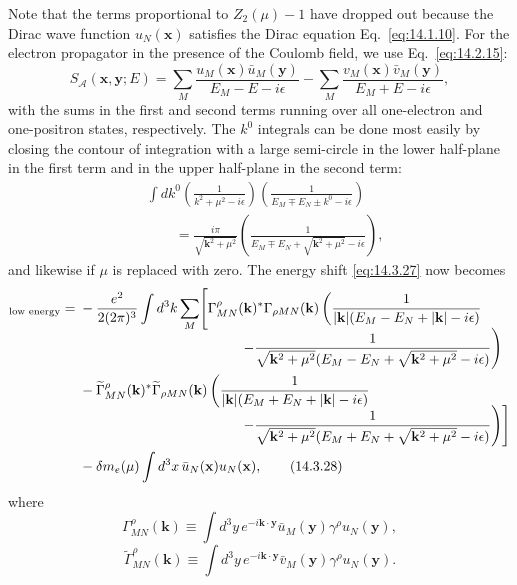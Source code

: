 Note that the terms proportional to $Z_2(\mu)-1$ have dropped out because the
Dirac wave function $u_N(\mathbf x)$ satisfies the Dirac equation
Eq.~\eqref{eq:14.1.10}. For the electron propagator in the presence of the
Coulomb field, we use Eq.~\eqref{eq:14.2.15}:
\[
S_{\mathcal A}(\mathbf x,\mathbf y;E)
=\sum_M\frac{u_M(\mathbf x)\bar u_M(\mathbf y)}{E_M-E-i\epsilon}
-\sum_M\frac{v_M(\mathbf x)\bar v_M(\mathbf y)}{E_M+E-i\epsilon},
\]
with the sums in the first and second terms running over all one-electron and
one-positron states, respectively. The $k^0$ integrals can be done most easily
by closing the contour of integration with a large semi-circle in the lower
half-plane in the first term and in the upper half-plane in the second term:
\begin{align*}
&\int dk^0\left(\frac{1}{k^2+\mu^2-i\epsilon}\right)
\left(\frac{1}{E_M\mp E_N\pm k^0-i\epsilon}\right)\\
&\qquad={}
\frac{i\pi}{\sqrt{\mathbf k^2+\mu^2}}
\left(\frac{1}{E_M\mp E_N+\sqrt{\mathbf k^2+\mu^2}-i\epsilon}\right),
\end{align*}
and likewise if $\mu$ is replaced with zero. The energy shift
\eqref{eq:14.3.27} now becomes
\begin{align}
[\delta E_N]_{\text{low energy}}
={}&-\frac{e^2}{2(2\pi)^3}\int d^3k\sum_M
\Biggl[\Gamma_{MN}^\rho(\mathbf k)^*\Gamma_{\rho MN}(\mathbf k)
\left(\frac{1}{|\mathbf k|(E_M-E_N+|\mathbf k|-i\epsilon)}
\right.\notag\\[-2mm]
&\left.\hspace{41mm}
-\frac{1}{\sqrt{\mathbf k^2+\mu^2}
(E_M-E_N+\sqrt{\mathbf k^2+\mu^2}-i\epsilon)}\right)\notag\\
&-\widetilde\Gamma_{MN}^\rho(\mathbf k)^*
\widetilde\Gamma_{\rho MN}(\mathbf k)
\left(\frac{1}{|\mathbf k|(E_M+E_N+|\mathbf k|-i\epsilon)}
\right.\notag\\[-2mm]
&\left.\hspace{41mm}
-\frac{1}{\sqrt{\mathbf k^2+\mu^2}
(E_M+E_N+\sqrt{\mathbf k^2+\mu^2}-i\epsilon)}\right)\Biggr]
\notag\\
&-\delta m_e(\mu)\int d^3x\,\bar u_N(\mathbf x)u_N(\mathbf x),
\tag{14.3.28}\label{eq:14.3.28}
\end{align}
where
\begin{equation}
\Gamma_{MN}^\rho(\mathbf k)
\equiv\int d^3y\,e^{-i\mathbf k\cdot\mathbf y}
\bar u_M(\mathbf y)\gamma^\rho u_N(\mathbf y),
\tag{14.3.29}\label{eq:14.3.29}
\end{equation}
\begin{equation}
\widetilde\Gamma_{MN}^\rho(\mathbf k)
\equiv\int d^3y\,e^{-i\mathbf k\cdot\mathbf y}
\bar v_M(\mathbf y)\gamma^\rho u_N(\mathbf y).
\tag{14.3.30}\label{eq:14.3.30}
\end{equation}
